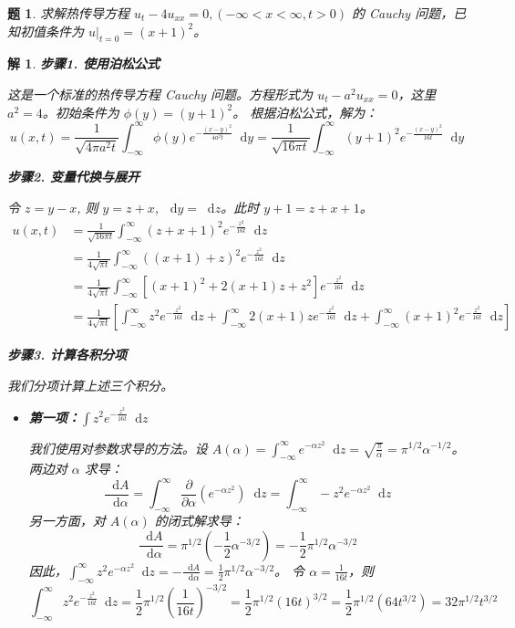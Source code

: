 \documentclass[12pt,a4paper]{article}
\newcommand{\diff}{\mathop{}\!\mathrm{d}}  %
\newtheorem{problem}{题}
\newtheorem*{solution}{解}
\begin{document}
	\begin{problem}
		求解热传导方程 $u_t - 4u_{xx} = 0, (-\infty < x < \infty, t>0)$ 的 Cauchy 问题，已知初值条件为 $u|_{t=0} = (x+1)^2$。
	\end{problem}
	\hrulefill
	\begin{solution}
		\textbf{步骤1. 使用泊松公式}
		
		\noindent
		这是一个标准的热传导方程 Cauchy 问题。方程形式为 $u_t - a^2 u_{xx}=0$，这里 $a^2=4$。初始条件为 $\phi(y)=(y+1)^2$。
		根据泊松公式，解为：
		\[ u(x,t) = \frac{1}{\sqrt{4\pi a^2 t}} \int_{-\infty}^\infty \phi(y) e^{-\frac{(x-y)^2}{4a^2 t}} \diff y = \frac{1}{\sqrt{16\pi t}} \int_{-\infty}^\infty (y+1)^2 e^{-\frac{(x-y)^2}{16t}} \diff y \]
		
		\hrulefill
		
		\textbf{步骤2. 变量代换与展开}
		
		\noindent
		令 $z=y-x$, 则 $y=z+x$, $\diff y = \diff z$。此时 $y+1 = z+x+1$。
		\begin{align*}
			u(x,t) &= \frac{1}{\sqrt{16\pi t}} \int_{-\infty}^\infty (z+x+1)^2 e^{-\frac{z^2}{16t}} \diff z \\
			&= \frac{1}{4\sqrt{\pi t}} \int_{-\infty}^\infty ((x+1)+z)^2 e^{-\frac{z^2}{16t}} \diff z \\
			&= \frac{1}{4\sqrt{\pi t}} \int_{-\infty}^\infty \left[ (x+1)^2 + 2(x+1)z + z^2 \right] e^{-\frac{z^2}{16t}} \diff z \\
			&= \frac{1}{4\sqrt{\pi t}} \left[ \int_{-\infty}^\infty z^2 e^{-\frac{z^2}{16t}} \diff z + \int_{-\infty}^\infty 2(x+1)z e^{-\frac{z^2}{16t}} \diff z + \int_{-\infty}^\infty (x+1)^2 e^{-\frac{z^2}{16t}} \diff z \right]
		\end{align*}
		
		\hrulefill
		
		\textbf{步骤3. 计算各积分项}
		
		\noindent
		我们分项计算上述三个积分。
		
		\begin{itemize}
			\item \textbf{第一项：$\int z^2 e^{-\frac{z^2}{16t}} \diff z$}
			
			我们使用对参数求导的方法。设 $A(\alpha) = \int_{-\infty}^\infty e^{-\alpha z^2} \diff z = \sqrt{\frac{\pi}{\alpha}} = \pi^{1/2}\alpha^{-1/2}$。
			两边对 $\alpha$ 求导：
			\[ \frac{\diff A}{\diff \alpha} = \int_{-\infty}^\infty \frac{\partial}{\partial \alpha} (e^{-\alpha z^2}) \diff z = \int_{-\infty}^\infty -z^2 e^{-\alpha z^2} \diff z \]
			另一方面，对 $A(\alpha)$ 的闭式解求导：
			\[ \frac{\diff A}{\diff \alpha} = \pi^{1/2} \left(-\frac{1}{2}\alpha^{-3/2}\right) = -\frac{1}{2}\pi^{1/2}\alpha^{-3/2} \]
			因此，$\int_{-\infty}^\infty z^2 e^{-\alpha z^2} \diff z = -\frac{\diff A}{\diff \alpha} = \frac{1}{2}\pi^{1/2}\alpha^{-3/2}$。
			令 $\alpha = \frac{1}{16t}$，则
			\[ \int_{-\infty}^\infty z^2 e^{-\frac{z^2}{16t}} \diff z = \frac{1}{2}\pi^{1/2}\left(\frac{1}{16t}\right)^{-3/2} = \frac{1}{2}\pi^{1/2}(16t)^{3/2} = \frac{1}{2}\pi^{1/2}(64t^{3/2}) = 32\pi^{1/2}t^{3/2} \]
			

\end{itemize}
\end{solution}
\end{document}
